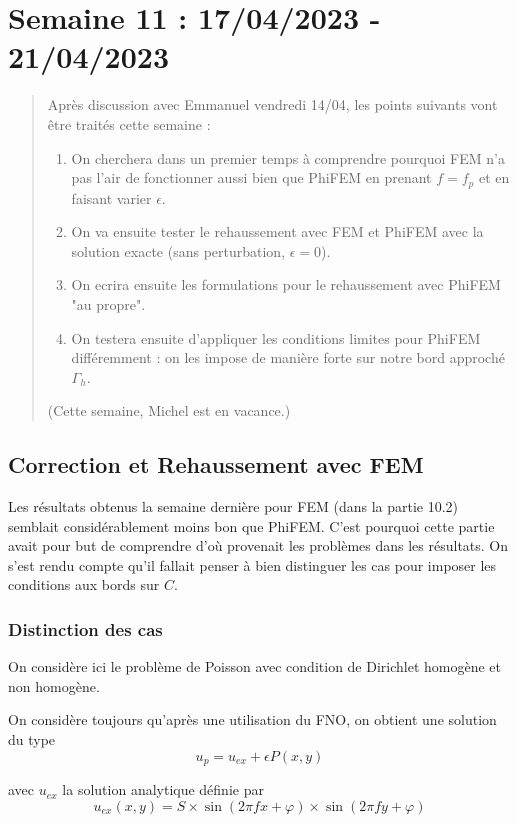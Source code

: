 \section{Semaine 11 : 17/04/2023 - 21/04/2023}
\graphicspath{{semaines/semaine_11/images/}}

\begin{abstract}
	Après discussion avec Emmanuel vendredi 14/04, les points suivants vont être traités cette semaine :
	\begin{enumerate}[label=\textbullet]
		\item On cherchera dans un premier temps à comprendre pourquoi FEM n'a pas l'air de fonctionner aussi bien que PhiFEM en prenant $f=f_p$ et en faisant varier $\epsilon$.
		\item On va ensuite tester le rehaussement avec FEM et PhiFEM avec la solution exacte (sans perturbation, $\epsilon=0$).
		\item On ecrira ensuite les formulations pour le rehaussement avec PhiFEM "au propre".
		\item On testera ensuite d'appliquer les conditions limites pour PhiFEM différemment : on les impose de manière forte sur notre bord approché $\Gamma_h$.
	\end{enumerate}
	(Cette semaine, Michel est en vacance.)
\end{abstract}

\subsection{Correction et Rehaussement avec FEM}

Les résultats obtenus la semaine dernière pour FEM (dans la partie 10.2) semblait considérablement moins bon que PhiFEM. C'est pourquoi cette partie avait pour but de comprendre d'où provenait les problèmes dans les résultats. On s'est rendu compte qu'il fallait penser à bien distinguer les cas pour imposer les conditions aux bords sur $C$. 

\subsubsection*{Distinction des cas}

On considère ici le problème de Poisson avec condition de Dirichlet homogène et non homogène. 

On considère toujours qu'après une utilisation du FNO, on obtient une solution du type
$$u_p = u_{ex}+\epsilon P(x,y)$$

avec $u_{ex}$ la solution analytique définie par
$$u_{ex}(x,y) = S\times\sin(2\pi fx + \varphi)\times\sin(2\pi fy + \varphi)$$ 

